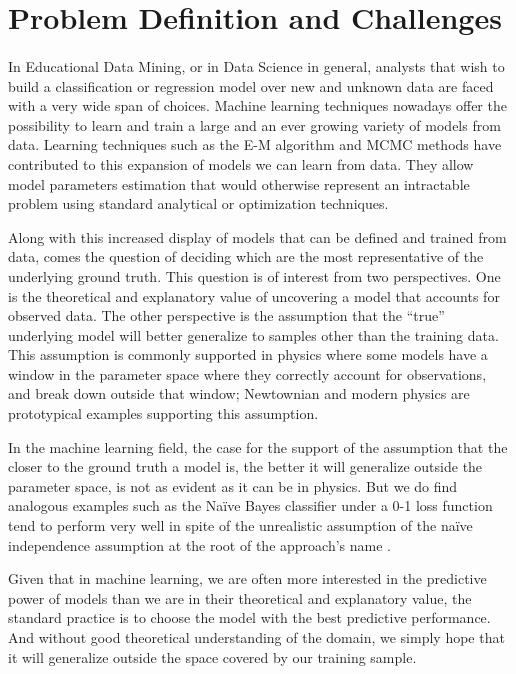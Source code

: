 \label{sec:Introduction} 

\section{Problem Definition and Challenges}
\paragraph{}

In Educational Data Mining, or in Data Science in general, analysts that wish to build a classification or regression model over new and unknown data are faced with a very wide span of choices.  Machine learning techniques nowadays offer the possibility to learn and train a large and an ever growing variety of models from data.  Learning techniques such as the E-M algorithm and MCMC methods have contributed to this expansion of models we can learn from data.  They allow model parameters estimation that would otherwise represent an intractable problem using standard analytical or optimization techniques.

Along with this increased display of models that can be defined and trained from data, comes the question of deciding which are the most representative of the underlying ground truth.  This question is of interest from two perspectives.  One is the theoretical and explanatory value of uncovering a model that accounts for observed data.  The other perspective is the assumption that the ``true'' underlying model will better generalize to samples other than the training data.  This assumption is commonly supported in physics where some models have a window in the parameter space where they correctly account for observations, and break down outside that window; Newtownian and modern physics are prototypical examples supporting this assumption.  

In the machine learning field, the case for the support of the assumption that the closer to the ground truth a model is, the better it will generalize outside the parameter space, is not as evident as it can be in physics. But we do find analogous examples such as the Naïve Bayes classifier under a 0-1 loss function tend to perform very well in spite of the unrealistic assumption of the naïve independence assumption at the root of the approach's name \citep{domingos1997}.

Given that in machine learning, we are often more interested in the predictive power of models than we are in their theoretical and explanatory value, the standard practice is to choose the model with the best predictive performance.  And without good theoretical understanding of the domain, we simply hope that it will generalize outside the space covered by our training sample.  

